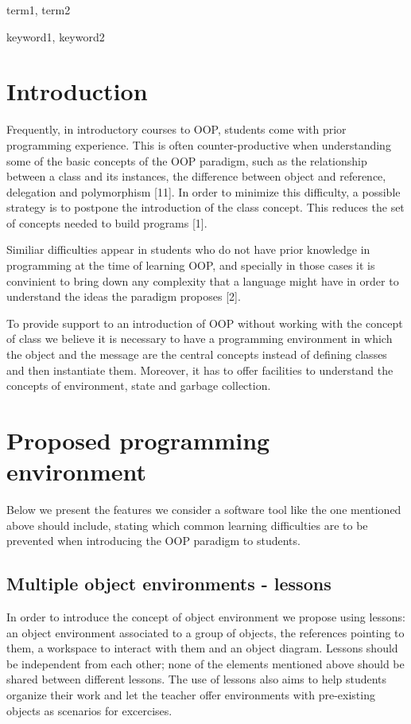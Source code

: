 \documentclass{sigplanconf}
\begin{document}
\terms
term1, term2

\keywords
keyword1, keyword2

\section{Introduction}

Frequently, in introductory courses to OOP, students come with prior programming experience. This is often counter-productive when understanding some of the basic concepts of the OOP paradigm, such as the relationship between a class and its instances, the difference between object and reference, delegation and polymorphism [11]. In order to minimize this difficulty, a possible strategy is to postpone the introduction of the class concept. This reduces the set of concepts needed to build programs [1]. 

Similiar difficulties appear in students who do not have prior knowledge in programming at the time of learning OOP, and specially in those cases it is convinient to bring down any complexity that a language might have in order to understand the ideas the paradigm proposes [2].

To provide support to an introduction of OOP without working with the concept of class we believe it is necessary to have a programming environment in which the object and the message are the central concepts instead of defining classes and then instantiate them.
Moreover, it has to offer facilities to understand the concepts of environment, state and garbage collection.

\section{Proposed programming environment}

Below we present the features we consider a software tool like the one mentioned above should include, stating which common learning difficulties are to be prevented when introducing the OOP paradigm to students. 

\subsection{Multiple object environments - lessons}

In order to introduce the concept of object environment we propose using lessons: an object environment associated to a group of objects, the references pointing to them, a workspace to interact with them and an object diagram. Lessons should be independent from each other; none of the elements mentioned above should be shared between different lessons.
The use of lessons also aims to help students organize their work and let the teacher offer environments with pre-existing objects as scenarios for excercises.
\end{document}
